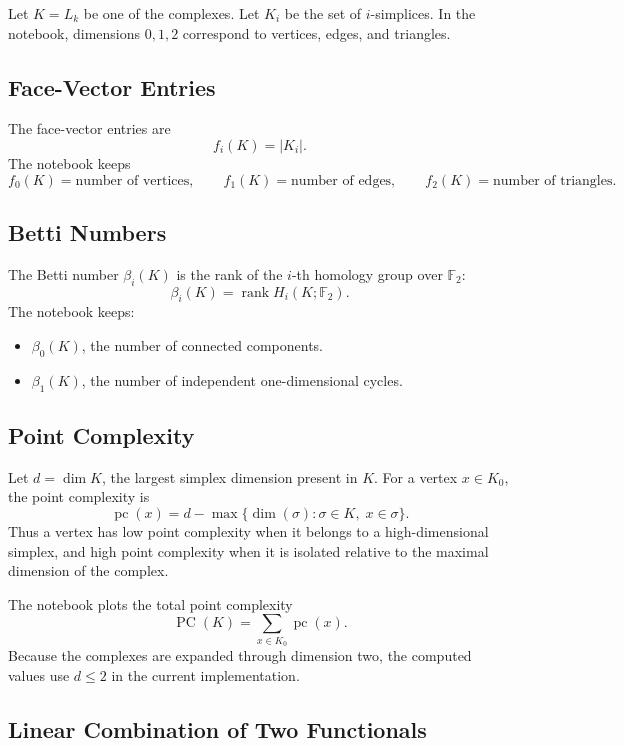 \documentclass[11pt]{article}
\begin{document}
Let \(K=L_k\) be one of the complexes. Let \(K_i\) be the set of \(i\)-simplices.
In the notebook, dimensions \(0,1,2\) correspond to vertices, edges, and
triangles.

\subsection{Face-Vector Entries}

The face-vector entries are
\[
  f_i(K)=|K_i|.
\]
The notebook keeps
\[
  f_0(K)=\text{number of vertices},\qquad
  f_1(K)=\text{number of edges},\qquad
  f_2(K)=\text{number of triangles}.
\]

\subsection{Betti Numbers}

The Betti number \(\beta_i(K)\) is the rank of the \(i\)-th homology group over
\(\mathbb{F}_2\):
\[
  \beta_i(K)=\operatorname{rank} H_i(K;\mathbb{F}_2).
\]
The notebook keeps:
\begin{itemize}
  \item \(\beta_0(K)\), the number of connected components.
  \item \(\beta_1(K)\), the number of independent one-dimensional cycles.
\end{itemize}

\subsection{Point Complexity}

Let \(d=\dim K\), the largest simplex dimension present in \(K\). For a vertex
\(x\in K_0\), the point complexity is
\[
  \operatorname{pc}(x)
  =
  d-\max\{\dim(\sigma):\sigma\in K,\; x\in\sigma\}.
\]
Thus a vertex has low point complexity when it belongs to a high-dimensional
simplex, and high point complexity when it is isolated relative to the maximal
dimension of the complex.

The notebook plots the total point complexity
\[
  \operatorname{PC}(K)
  =
  \sum_{x\in K_0}\operatorname{pc}(x).
\]
Because the complexes are expanded through dimension two, the computed values
use \(d\leq 2\) in the current implementation.

\subsection{Linear Combination of Two Functionals}
\end{document}
